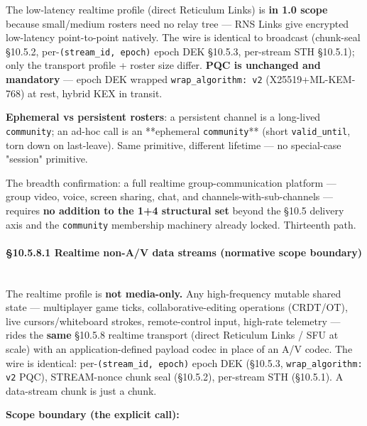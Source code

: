 \documentclass[10pt]{article}
\begin{document}
The low-latency realtime profile (direct Reticulum Links) is \textbf{in 1.0 scope} because small/medium rosters need no relay tree — RNS Links give encrypted low-latency point-to-point natively. The wire is identical to broadcast (chunk-seal §10.5.2, per-\texttt{(stream\_id, epoch)} epoch DEK §10.5.3, per-stream STH §10.5.1); only the transport profile + roster size differ. \textbf{PQC is unchanged and mandatory} — epoch DEK wrapped \texttt{wrap\_algorithm: v2} (X25519+ML-KEM-768) at rest, hybrid KEX in transit.


\textbf{Ephemeral vs persistent rosters}: a persistent channel is a long-lived \texttt{community}; an ad-hoc call is an **ephemeral \texttt{community}** (short \texttt{valid\_until}, torn down on last-leave). Same primitive, different lifetime — no special-case "session" primitive.


The breadth confirmation: a full realtime group-communication platform — group video, voice, screen sharing, chat, and channels-with-sub-channels — requires \textbf{no addition to the 1+4 structural set} beyond the §10.5 delivery axis and the \texttt{community} membership machinery already locked. Thirteenth path.


\paragraph{§10.5.8.1 Realtime non-A/V data streams (normative scope boundary)}\mbox{}\\


The realtime profile is \textbf{not media-only.} Any high-frequency mutable shared state — multiplayer game ticks, collaborative-editing operations (CRDT/OT), live cursors/whiteboard strokes, remote-control input, high-rate telemetry — rides the \textbf{same} §10.5.8 realtime transport (direct Reticulum Links / SFU at scale) with an application-defined payload codec in place of an A/V codec. The wire is identical: per-\texttt{(stream\_id, epoch)} epoch DEK (§10.5.3, \texttt{wrap\_algorithm: v2} PQC), STREAM-nonce chunk seal (§10.5.2), per-stream STH (§10.5.1). A data-stream chunk is just a chunk.


\textbf{Scope boundary (the explicit call):}
\end{document}
